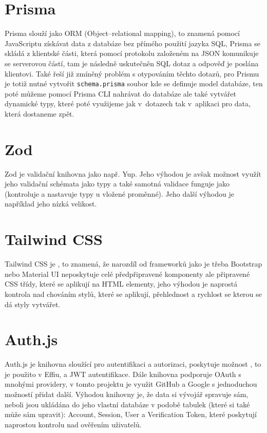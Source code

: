 \documentclass[12pt, a4paper,
openright
]{report}
\begin{document}
\section{Prisma}
Prisma slouží jako ORM (Object–relational mapping), to znamená pomocí JavaScriptu získávat data z databáze bez přímého použití jazyka SQL, Prisma se skládá z klientské části, která pomocí protokolu založeném na JSON komunikuje se serverovou částí, tam je následně uskutečněn SQL dotaz a odpověď je poslána klientovi. Také řeší již zmíněný problém s otypováním těchto dotazů, pro Prismu je totiž nutné vytvořit \texttt{schema.prisma} soubor kde se definuje model databáze, ten poté můžeme pomocí Prisma CLI nahrávat do databáze ale také vytvářet dynamické typy, které poté využijeme jak v~dotazech tak v~aplikaci pro data, která dostaneme zpět.

\section{Zod}
Zod je validační knihovna jako např. Yup. Jeho výhodou je avšak možnost využít jeho validační schémata jako typy a také samotná validace funguje jako  (kontroluje a nastavuje typy u vložené proměnné). Jeho další výhodou je například jeho nízká velikost.

\section{Tailwind CSS}
Tailwind CSS je , to znamená, že narozdíl od frameworků jako je třeba Bootstrap nebo Material UI neposkytuje celé předpřipravené komponenty ale připravené CSS třídy, které se aplikují na HTML elementy, jeho výhodou je naprostá kontrola nad chováním stylů, které se aplikují, přehlednost a rychlost se kterou se dá styly vytvářet.

\section{Auth.js}
Auth.js je knihovna sloužící pro autentifikaci a autorizaci, poskytuje možnost , to je použito v Effiu, a JWT autentifikace. Dále knihovna podporuje OAuth s mnohými providery, v tomto projektu je využit GitHub a Google s jednoduchou možností přidat další. Výhodou knihovny je, že data si vývojář spravuje sám, neboli jsou ukládána do jeho vlastní databáze v podobě tabulek (které si také může sám upravit): Account, Session, User a Verification Token, které poskytují naprostou kontrolu nad ověřením uživatelů.
\end{document}
